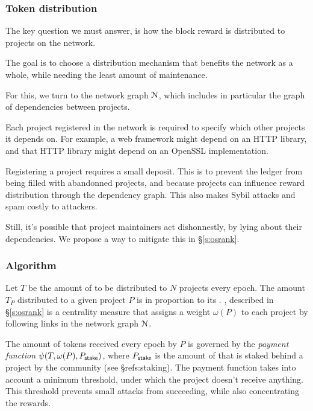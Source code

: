 \subsubsection{Token distribution}

The key question we must answer, is how the block reward is distributed to
projects on the network.

The goal is to choose a distribution mechanism that benefits the network as a
whole, while needing the least amount of maintenance.

For this, we turn to the network graph $\mathcal{N}$, which includes in
particular the graph of dependencies between projects.

Each project registered in the network is required to specify which other
projects it depends on. For example, a web framework might depend on an HTTP
library, and that HTTP library might depend on an OpenSSL implementation.

Registering a project requires a small deposit. This is to prevent the ledger
from being filled with abandonned projects, and because projects can influence
reward distribution through the dependency graph. This also makes Sybil attacks
and spam costly to attackers.

Still, it's possible that project maintainers act dishonnestly, by lying about
their dependencies. We propose a way to mitigate this in \S \ref{s:osrank}.

\subsubsection{Algorithm} Let $T$ be the amount of \oscoin{} to be distributed
to $N$ projects every epoch. The amount $T_P$ distributed to a given project $P$
is in proportion to its \osrank{}. \osrank{}, described in \S \ref{s:osrank} is
a centrality measure that assigns a weight $\omega(P)$ to each project by
following links in the network graph $\mathcal{N}$.

The amount of tokens received every epoch by $P$ is governed by the
\emph{payment function} $\psi(T, \omega(P), P_{\mathsf{stake}})$, where
$P_{\mathsf{stake}}$ is the amount of \oscoin{} that is staked behind a project by
the community (see \S ref{s:staking}). The payment function takes into account a
minimum threshold, under which the project doesn't receive anything. This
threshold prevents small attacks from succeeding, while also concentrating the
rewards.

